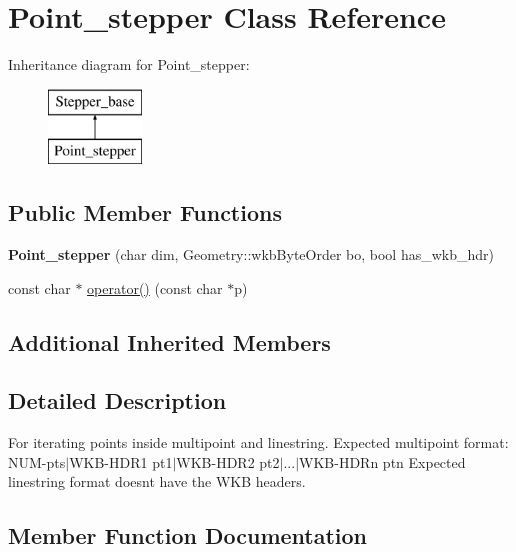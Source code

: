 \hypertarget{classPoint__stepper}{}\section{Point\+\_\+stepper Class Reference}
\label{classPoint__stepper}
Inheritance diagram for Point\+\_\+stepper\+:\begin{figure}[H]
\begin{center}
\leavevmode
\includegraphics[height=2.000000cm]{classPoint__stepper}
\end{center}
\end{figure}
\subsection*{Public Member Functions}
\begin{DoxyCompactItemize}
\item 
\mbox{\label{classPoint__stepper_a97ca416039d43365f69ded7c3d10df44}} 
{\bfseries Point\+\_\+stepper} (char dim, Geometry\+::wkb\+Byte\+Order bo, bool has\+\_\+wkb\+\_\+hdr)
\item 
const char $\ast$ \mbox{\hyperlink{classPoint__stepper_a1e992867e096d4bcde1cd79aa25398d6}{operator()}} (const char $\ast$p)
\end{DoxyCompactItemize}
\subsection*{Additional Inherited Members}


\subsection{Detailed Description}
For iterating points inside multipoint and linestring. Expected multipoint format\+: N\+UM-\/pts$\vert$\+W\+KB-\/H\+D\+R1 pt1$\vert$\+W\+KB-\/H\+D\+R2 pt2$\vert$...$\vert$\+W\+KB-\/H\+D\+Rn ptn Expected linestring format doesn\textquotesingle{}t have the W\+KB headers. 

\subsection{Member Function Documentation}
\mbox{\label{classPoint__stepper_a1e992867e096d4bcde1cd79aa25398d6}} 
